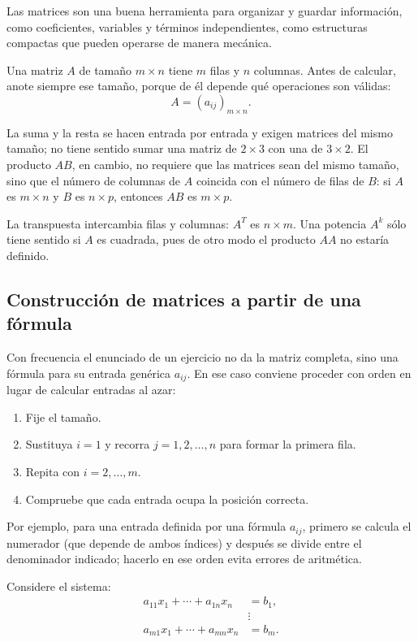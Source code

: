 \documentclass[12pt,a4paper]{article}
\begin{document}
Las matrices son una buena herramienta para organizar y guardar información, como coeficientes, variables y términos independientes, como estructuras compactas que pueden operarse de manera mecánica.

Una matriz \(A\) de tamaño \(m\times n\) tiene \(m\) filas y \(n\) columnas. Antes de calcular, anote siempre ese tamaño, porque de él depende qué operaciones son válidas:
\[
A=(a_{ij})_{m\times n}.
\]

La suma y la resta se hacen entrada por entrada y exigen matrices del mismo tamaño; no tiene sentido sumar una matriz de \(2\times3\) con una de \(3\times2\). El producto \(AB\), en cambio, no requiere que las matrices sean del mismo tamaño, sino que el número de columnas de \(A\) coincida con el número de filas de \(B\): si \(A\) es \(m\times n\) y \(B\) es \(n\times p\), entonces \(AB\) es \(m\times p\).

La transpuesta intercambia filas y columnas: \(A^T\) es \(n\times m\). Una potencia \(A^k\) sólo tiene sentido si \(A\) es cuadrada, pues de otro modo el producto \(AA\) no estaría definido.

\subsection{Construcción de matrices a partir de una fórmula}
Con frecuencia el enunciado de un ejercicio no da la matriz completa, sino una fórmula para su entrada genérica \(a_{ij}\). En ese caso conviene proceder con orden en lugar de calcular entradas al azar:
\begin{enumerate}
    \item Fije el tamaño.
    \item Sustituya \(i=1\) y recorra \(j=1,2,\ldots,n\) para formar la primera fila.
    \item Repita con \(i=2,\ldots,m\).
    \item Compruebe que cada entrada ocupa la posición correcta.
\end{enumerate}

Por ejemplo, para una entrada definida por una fórmula \(a_{ij}\), primero se calcula el numerador (que depende de ambos índices) y después se divide entre el denominador indicado; hacerlo en ese orden evita errores de aritmética.

Considere el sistema:
\[
\begin{aligned}
a_{11}x_1+\cdots+a_{1n}x_n&=b_1,\\
&\vdots\\
a_{m1}x_1+\cdots+a_{mn}x_n&=b_m.
\end{aligned}
\]
\end{document}
